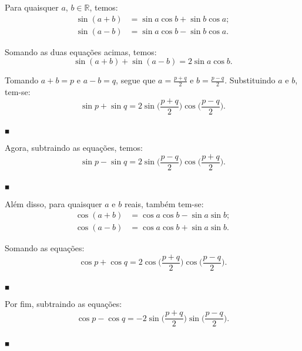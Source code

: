 \documentclass{article}
\begin{document}
{\begin{newpage}
\par Para quaisquer $a$, $b\in\mathbb{R}$, temos:
\begin{equation*}
\begin{split}
\sin{(a+b)} &= \sin{a}\cos{b} + \sin{b}\cos{a}; \\
\sin{(a-b)} &= \sin{a}\cos{b} - \sin{b}\cos{a}.
\end{split}
\end{equation*}
\par Somando as duas equações acimas, temos:
\begin{equation*} \sin{(a+b)} + \sin{(a-b)} = 2\sin{a}\cos{b}. \end{equation*}
\par Tomando $a+b=p$ e $a-b=q$, segue que $\displaystyle{a=\frac{p+q}{2}}$ e $\displaystyle{b=\frac{p-q}{2}}$. Substituindo $a$ e $b$, tem-se:
\begin{equation*} \sin{p} + \sin{q} = 2\sin{\Big(\frac{p+q}{2}\Big)}\cos{\Big(\frac{p-q}{2}\Big)}.  \end{equation*} \begin{flushright} $_{\blacksquare }$ \end{flushright}
\par Agora, subtraindo as equações, temos:
\begin{equation*} \sin{p} - \sin{q} = 2\sin{\Big(\frac{p-q}{2}\Big)} \cos{\Big(\frac{p+q}{2}\Big)}. \end{equation*} \begin{flushright} $_{\blacksquare }$ \end{flushright}
\par Além disso, para quaisquer $a$ e $b$ reais, também tem-se:
\begin{equation*}
\begin{split}
\cos{(a+b)} &= \cos{a}\cos{b} - \sin{a}\sin{b}; \\
\cos{(a-b)} &= \cos{a}\cos{b} + \sin{a}\sin{b}.
\end{split}
\end{equation*}
\par Somando as equações:
\begin{equation*} \cos{p} + \cos{q} = 2\cos{\Big(\frac{p+q}{2}\Big)}\cos{\Big(\frac{p-q}{2}\Big)}. \end{equation*} \begin{flushright} $_{\blacksquare }$ \end{flushright}
\par Por fim, subtraindo as equações:
\begin{equation*} \cos{p} - \cos{q} = -2\sin{\Big(\frac{p+q}{2}\Big)}\sin{\Big(\frac{p-q}{2}\Big)}. \end{equation*} \begin{flushright} $_{\blacksquare }$ \end{flushright}

\end{newpage}}
\end{document}
